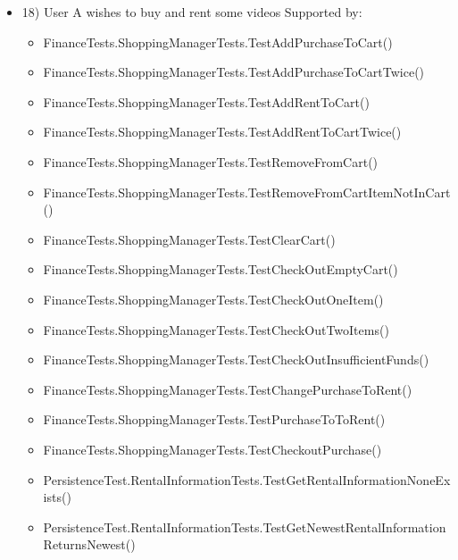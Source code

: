 \begin{itemize}
\item 18)
User A wishes to buy and rent some videos
\newline Supported by:
\begin{itemize}
\item FinanceTests.ShoppingManagerTests.TestAddPurchaseToCart()
\item FinanceTests.ShoppingManagerTests.TestAddPurchaseToCartTwice()
\item FinanceTests.ShoppingManagerTests.TestAddRentToCart()
\item FinanceTests.ShoppingManagerTests.TestAddRentToCartTwice()
\item FinanceTests.ShoppingManagerTests.TestRemoveFromCart()
\item FinanceTests.ShoppingManagerTests.TestRemoveFromCartItemNotInCart()
\item FinanceTests.ShoppingManagerTests.TestClearCart()
\item FinanceTests.ShoppingManagerTests.TestCheckOutEmptyCart()
\item FinanceTests.ShoppingManagerTests.TestCheckOutOneItem()
\item FinanceTests.ShoppingManagerTests.TestCheckOutTwoItems()
\item FinanceTests.ShoppingManagerTests.TestCheckOutInsufficientFunds()
\item FinanceTests.ShoppingManagerTests.TestChangePurchaseToRent()
\item FinanceTests.ShoppingManagerTests.TestPurchaseToToRent()
\item FinanceTests.ShoppingManagerTests.TestCheckoutPurchase()
\item PersistenceTest.RentalInformationTests.TestGetRentalInformationNoneExists()
\item PersistenceTest.RentalInformationTests.TestGetNewestRentalInformationReturnsNewest()
\end{itemize}

\end{itemize}